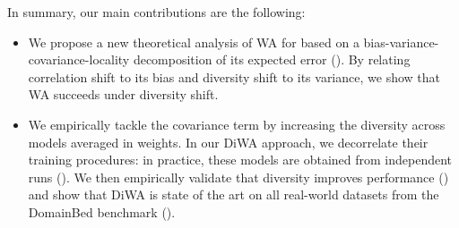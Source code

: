 In summary, our main contributions are the following:
\begin{itemize}
    \item We propose a new theoretical analysis of WA for \ood based on a bias-variance-covariance-locality decomposition of its expected error (). By relating correlation shift to its bias and diversity shift to its variance, we show that WA succeeds under diversity shift.
    \item We empirically tackle the covariance term by increasing the diversity across models averaged in weights. In our DiWA approach, we decorrelate their training procedures: in practice, these models are obtained from independent runs ().
    We then empirically validate that diversity improves \ood performance () and show that DiWA is state of the art on all real-world datasets from the DomainBed benchmark \cite{gulrajani2021in} ().%
\end{itemize}%